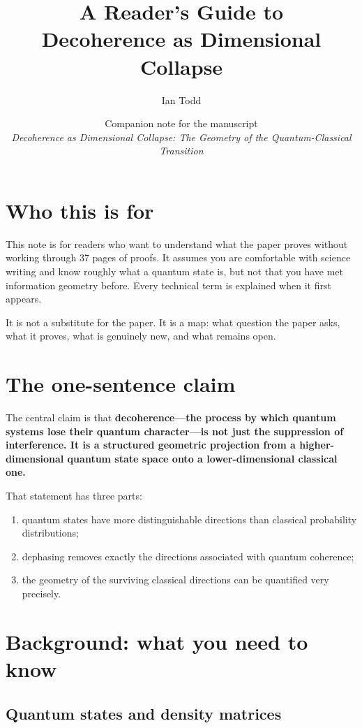 \documentclass[11pt,a4paper]{article}
\title{\textbf{A Reader's Guide to\\Decoherence as Dimensional Collapse}}
\author{Ian Todd}
\date{Companion note for the manuscript\\\emph{Decoherence as Dimensional Collapse: The Geometry of the Quantum-Classical Transition}}
\begin{document}
\maketitle

\section*{Who this is for}

This note is for readers who want to understand what the paper proves without working through 37 pages of proofs.  It assumes you are comfortable with science writing and know roughly what a quantum state is, but not that you have met information geometry before.  Every technical term is explained when it first appears.

It is not a substitute for the paper.  It is a map: what question the paper asks, what it proves, what is genuinely new, and what remains open.

\section*{The one-sentence claim}

The central claim is that \textbf{decoherence---the process by which quantum systems lose their quantum character---is not just the suppression of interference.  It is a structured geometric projection from a higher-dimensional quantum state space onto a lower-dimensional classical one.}

That statement has three parts:
\begin{enumerate}[leftmargin=1.5em]
\item quantum states have more distinguishable directions than classical probability distributions;
\item dephasing removes exactly the directions associated with quantum coherence;
\item the geometry of the surviving classical directions can be quantified very precisely.
\end{enumerate}

\section*{Background: what you need to know}

\subsection*{Quantum states and density matrices}
\end{document}
